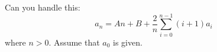   Can you handle this:
  \[
  a_n = An + B + \frac{2}{n} \sum_{i=0}^{n-1} (i + 1) a_i
  \]
  where $n > 0$. Assume that $a_0$ is given.
